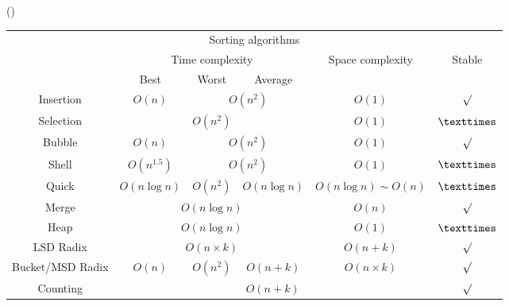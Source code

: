 \item \begin{theorem}{()} \quad\quad \begin{table}[H]
        \centering
        \begin{tabular}{|c|c|c|c|c|c|}
            \hline
            \multicolumn{6}{|c|}{Sorting algorithms} \\
            \Xhline{3\arrayrulewidth}
            \multirow{2}{*}{Method} & \multicolumn{3}{c|}{Time complexity} & \multirow{2}{*}{Space complexity} & \multirow{2}{*}{Stable} \\
            \cline{2-4}
            & Best & Worst & Average & & \\
            \Xhline{2\arrayrulewidth}
            Insertion & $O(n)$ & \multicolumn{2}{c|}{$O(n^2)$} & $O(1)$ & $\surd$ \\
            \hline
            Selection & \multicolumn{3}{c|}{$O(n^2)$} & $O(1)$ & $\texttimes$ \\
            \hline
            Bubble & $O(n)$ & \multicolumn{2}{c|}{$O(n^2)$} & $O(1)$ & $\surd$ \\
            \hline
            Shell & $O(n^{1.5})$ & \multicolumn{2}{c|}{$O(n^2)$} & $O(1)$ & $\texttimes$ \\
            \hline
            Quick & $O(n\log n)$ & $O(n^2)$ & $O(n\log n)$ & $O(n\log n) \sim O(n)$ & $\texttimes$ \\
            \hline
            Merge & \multicolumn{3}{c|}{$O(n\log n)$} & $O(n)$ & $\surd$ \\
            \hline
            Heap & \multicolumn{3}{c|}{$O(n\log n)$} & $O(1)$ & $\texttimes$ \\
            \hline
            LSD Radix & \multicolumn{3}{c|}{$O(n \times k)$} & $O(n + k)$ & $\surd$ \\
            \hline
            Bucket/MSD Radix & $O(n)$ & $O(n^2)$ & $O(n + k)$ & $O(n \times k)$ & $\surd$ \\
            \hline
            Counting & \multicolumn{4}{c|}{$O(n + k)$} & $\surd$ \\
            \hline
        \end{tabular}
    \end{table}
\end{theorem}
